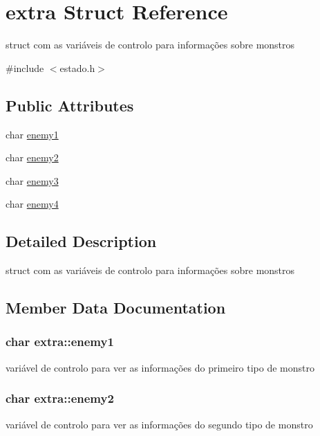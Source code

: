 \hypertarget{structextra}{}\section{extra Struct Reference}
\label{structextra}


struct com as variáveis de controlo para informações sobre monstros  




{\ttfamily \#include $<$estado.\+h$>$}

\subsection*{Public Attributes}
\begin{DoxyCompactItemize}
\item 
char \hyperlink{structextra_af8336ab7e57b376447a3bfb4112b8ffe}{enemy1}
\item 
char \hyperlink{structextra_a5ae8aa9143b5b0841bef755a62af4fee}{enemy2}
\item 
char \hyperlink{structextra_a9f211725642d5750659098c3420f82e7}{enemy3}
\item 
char \hyperlink{structextra_af097e62d6e52792827891bdd9272d95f}{enemy4}
\end{DoxyCompactItemize}


\subsection{Detailed Description}
struct com as variáveis de controlo para informações sobre monstros 

\subsection{Member Data Documentation}
\subsubsection[{\texorpdfstring{enemy1}{enemy1}}]{\setlength{\rightskip}{0pt plus 5cm}char extra\+::enemy1}\hypertarget{structextra_af8336ab7e57b376447a3bfb4112b8ffe}{}\label{structextra_af8336ab7e57b376447a3bfb4112b8ffe}
variável de controlo para ver as informações do primeiro tipo de monstro 
\subsubsection[{\texorpdfstring{enemy2}{enemy2}}]{\setlength{\rightskip}{0pt plus 5cm}char extra\+::enemy2}\hypertarget{structextra_a5ae8aa9143b5b0841bef755a62af4fee}{}\label{structextra_a5ae8aa9143b5b0841bef755a62af4fee}
variável de controlo para ver as informações do segundo tipo de monstro 
